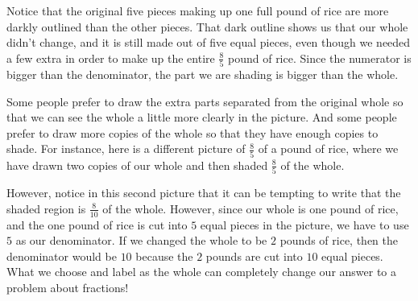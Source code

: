 \documentclass{ximera}
\begin{document}
\begin{example}
\begin{image} \end{image}

Notice that the original five pieces making up one full pound of rice are more darkly outlined than the other pieces. That dark outline shows us that our whole didn't change, and it is still made out of five equal pieces, even though we needed a few extra in order to make up the entire $\frac{8}{5}$ pound of rice. Since the numerator is bigger than the denominator, the part we are shading is bigger than the whole.

Some people prefer to draw the extra parts separated from the original whole so that we can see the whole a little more clearly in the picture. And some people prefer to draw more copies of the whole so that they have enough copies to shade. For instance, here is a different picture of $\frac{8}{5}$ of a pound of rice, where we have drawn two copies of our whole and then shaded $\frac{8}{5}$ of the whole.

\begin{image} \end{image}

However, notice in this second picture that it can be tempting to write that the shaded region is $\frac{8}{10}$ of the whole. However, since our whole is one pound of rice, and the one pound of rice is cut into $5$ equal pieces in the picture, we have to use $5$ as our denominator. If we changed the whole to be $2$ pounds of rice, then the denominator would be $10$ because the $2$ pounds are cut into $10$ equal pieces. What we choose and label as the whole can completely change our answer to a problem about fractions!

\end{example}
\end{document}
